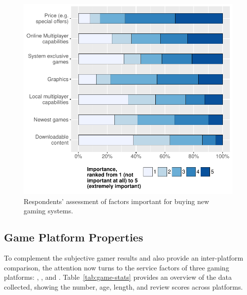 \begin{figure}[!t]
	\centering
	\includegraphics[width=1.0\columnwidth]{images/buyingfactors.pdf}
	\caption{Respondents' assessment of factors important for buying
	new gaming systems.}
\label{fig:buying-factors}
\end{figure}





\subsection{Game Platform Properties}\label{subsec:platformproperties}

To complement the subjective gamer results and also provide an
inter-platform comparison, the attention now turns to the service
factors of three gaming platforms: \steam, \gfnow, and \psnow.
Table~\ref{tab:game-stats} provides an overview of the data
collected, showing the number, age, length, and review scores
across platforms.

% 
% 


